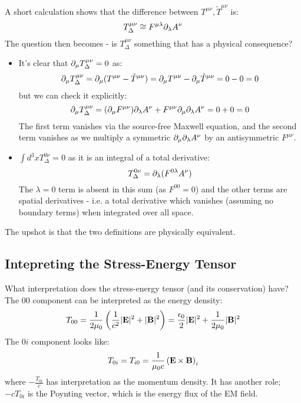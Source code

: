 A short calculation shows that the difference between $T^{\mu\nu}, \tilde{T}^{\mu\nu}$ is:
\begin{equation}
    T^{\mu\nu}_{\Delta} \cong F^{\mu\lambda}\partial_\lambda A^\nu
\end{equation}
The question then becomes - is $T^{\mu\nu}_{\Delta}$ something that has a physical consequence?
\begin{itemize}
    \item It's clear that $\partial_\mu T^{\mu\nu}_{\Delta} = 0$ as:
    \begin{equation}
        \partial_\mu T^{\mu\nu}_{\Delta} = \partial_\mu (T^{\mu\nu} - \tilde{T}^{\mu\nu}) = \partial_\mu T^{\mu\nu} - \partial_\mu \tilde{T}^{\mu\nu} = 0 - 0 = 0
    \end{equation}
    but we can check it explicitly:
    \begin{equation}
        \partial_\mu T^{\mu\nu}_{\Delta} = (\partial_\mu F^{\mu\nu})\partial_\lambda A^\nu + F^{\mu\nu}\partial_\mu \partial_\lambda A^\nu = 0 + 0 = 0
    \end{equation}
    The first term vanishes via the source-free Maxwell equation, and the second term vanishes as we multiply a symmetric $\partial_\mu \partial_\lambda A^\nu $ by an antisymmetric $F^{\mu\nu}$.

    \item $\int d^3x T^{0\nu}_{\Delta} = 0$ as it is an integral of a total derivative:
    \begin{equation}
        T^{0\nu}_\Delta = \partial_\lambda(F^{0\lambda}A^\nu)
    \end{equation}
    The $\lambda = 0$ term is absent in this sum (as $F^{00} = 0$) and the other terms are spatial derivatives - i.e. a total derivative which vanishes (assuming no boundary terms) when integrated over all space.
\end{itemize}
The upshot is that the two definitions are physically equivalent.

\subsection{Intepreting the Stress-Energy Tensor}
What interpretation does the stress-energy tensor (and its conservation) have? The $00$ component can be interpreted as the energy density:
\begin{equation}
    T_{00} = \frac{1}{2\mu_0}\left(\frac{1}{c^2}\lvert \mathbf{E} \rvert^2 + \lvert \mathbf{B} \rvert^2\right) = \frac{\epsilon_0}{2}\lvert \mathbf{E} \rvert^2 + \frac{1}{2\mu_0}\lvert \mathbf{B} \rvert^2
\end{equation}
The $0i$ component looks like:
\begin{equation}
    T_{0i} = T_{i0} = \frac{1}{\mu_0 c}\left(\mathbf{E} \times \mathbf{B}\right)_i
\end{equation}
where $-\frac{T_{0i}}{c}$ has interpretation as the momentum density. It has another role; $-cT_{0i}$ is the Poynting vector, which is the energy flux of the EM field.

